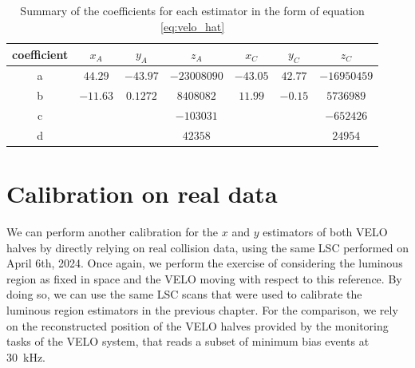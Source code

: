 \begin{table}
\centering
\begin{tabular}{c|c|c|c|c|c|c}
coefficient  & $x_A$   & $y_A$   & $z_A$      & $x_C$   & $y_C$  & $z_C$      \\\hline
a & $44.29$  & $-43.97$ &  $-23008090$    & $-43.05$ & $42.77$ &   $-16950459$   \\
b & $-11.63$ & $0.1272$ & $8408082$   & $11.99$  & $-0.15$ &  $5736989$ \\
c &        &        & $-103031$   &        &       &  $-652426 $  \\
d &        &        &  $42358$ &        &       & $24954$
\end{tabular}
\caption{Summary of the coefficients for each estimator in the form of equation \eqref{eq:velo_hat}}\label{tab:coefficients}
\end{table}

\section{Calibration on real data}
We can perform another calibration for the $x$ and $y$ estimators of both VELO halves by directly relying on real collision data, using the same LSC performed on April 6th, 2024. 
Once again, we perform the exercise of considering the luminous region as fixed in space and the VELO moving with respect to this reference. By doing so, we can use the same LSC scans that were used to calibrate the luminous region estimators in the previous chapter. For the comparison, we rely on the reconstructed position of the VELO halves provided by the monitoring tasks of the VELO system, that reads a subset of minimum bias events at \SI{30}{\kilo\hertz}. 

